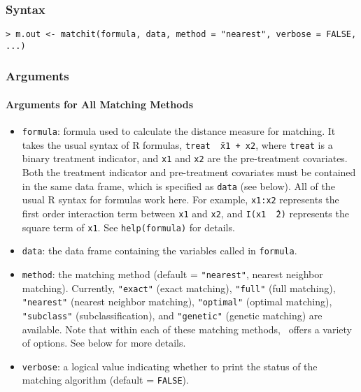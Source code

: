 \subsubsection{Syntax}
\begin{verbatim}
> m.out <- matchit(formula, data, method = "nearest", verbose = FALSE, ...)
\end{verbatim}

\subsubsection{Arguments}

\paragraph{Arguments for All Matching Methods}

\begin{itemize}

\item \texttt{formula}: formula used to calculate the distance measure
  for matching.  It takes the usual syntax of R formulas, {\tt treat
    \~\ x1 + x2}, where {\tt treat} is a binary treatment indicator,
  and {\tt x1} and {\tt x2} are the pre-treatment covariates. Both the
  treatment indicator and pre-treatment covariates must be contained
  in the same data frame, which is specified as {\tt data} (see
  below).  All of the usual R syntax for formulas work here. For
  example, {\tt x1:x2} represents the first order interaction term
  between {\tt x1} and {\tt x2}, and {\tt I(x1 \^\ 2)} represents the
  square term of {\tt x1}. See {\tt help(formula)} for details.
  
\item \texttt{data}: the data frame containing the variables called in
  {\tt formula}.  
  
\item \texttt{method}: the matching method (default =
  \texttt{"nearest"}, nearest neighbor matching).  Currently,
  \texttt{"exact"} (exact matching), \texttt{"full"} (full matching),
  \texttt{"nearest"} (nearest neighbor matching), \texttt{"optimal"}
  (optimal matching), \texttt{"subclass"} (subclassification), and
  \texttt{"genetic"} (genetic matching) are available. Note that
  within each of these matching methods, \MatchIt\ offers a variety of
  options. See below for more details.
  
\item \texttt{verbose}: a logical value indicating whether to print
  the status of the matching algorithm (default = \texttt{FALSE}).
\end{itemize}


